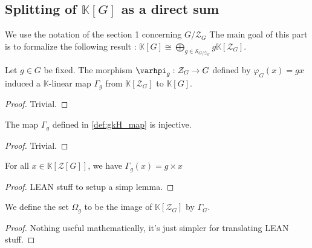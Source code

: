 \subsection{Splitting of $\mathbb{K}[G]$ as a direct sum}

We use the notation of the section 1 concerning $G/\mathcal{Z}_G$
The main goal of this part is to formalize the following result :
$\mathbb{K}[G] \cong \bigoplus\limits_{g\in \mathcal{S}_{G/\mathcal{Z}_G} } g \mathbb{K}[\mathcal{Z}_G]$.

\begin{definition}
    \label{def:gkH_map}
    \uses{}
    \leanok
    Let $g\in G$ be fixed. The morphism $\varhpi_g : \mathcal{Z}_G\rightarrow G$ defined by
    $\varphi_G(x)=gx$ induced a $\mathbb{K}$-linear map $\Gamma_g$ from $\mathbb{K}[\mathcal{Z}_G]$ to $\mathbb{K}[G]$.
    \begin{proof}    
        \leanok
        Trivial.
    \end{proof}
\end{definition}

\begin{proposition}
    \label{prop:gkH_map_Injective}
    \leanok
    The map $\Gamma_g$ defined in \ref{def:gkH_map} is injective.
\end{proposition}
\begin{proof}
    \leanok
    Trivial.
\end{proof}

\begin{proposition}
    \label{prop:gkH_map_eq}
    \leanok
    For all $x\in\mathbb{K}[\mathcal{Z}[G]]$, we have $\Gamma_g(x)=g\times x$
\end{proposition}
\begin{proof}
    \leanok
    LEAN stuff to setup a simp lemma.
\end{proof}

\begin{definition}
    \label{def:gkH_set}
    \leanok
    We define the set $\Omega_g$ to be the image of $\mathbb{K}[\mathcal{Z}_G]$
    by $\Gamma_G$.
    \begin{proof}    
        \leanok
        Nothing useful mathematically, it's just simpler for translating LEAN stuff.
    \end{proof}
\end{definition}

